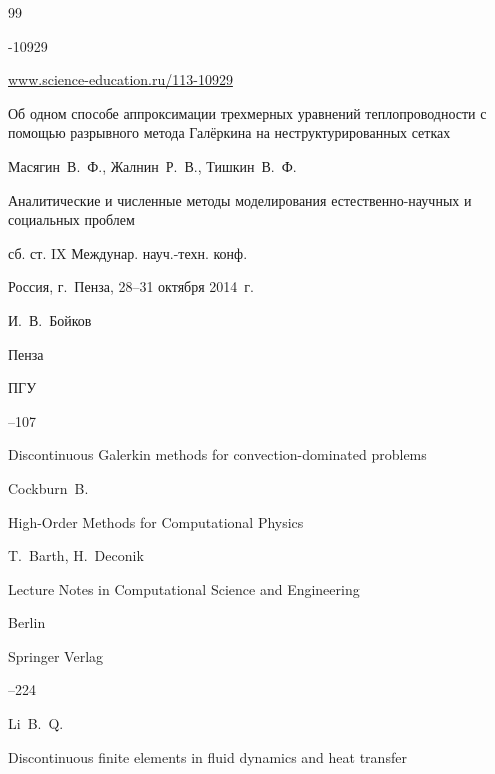 \begin{thebibliography}{99}

-10929

\elink \url{www.science-education.ru/113-10929}






\paper Об одном способе аппроксимации трехмерных уравнений теплопроводности с помощью разрывного метода Галёркина на неструктурированных сетках

\by Масягин~В.~Ф., Жалнин~Р.~В., Тишкин~В.~Ф.

\inbook Аналитические и численные методы моделирования естественно-научных и социальных проблем 

\bookinfo сб. ст. IX Междунар. науч.-техн. конф. 

\procinfo Россия, г.~Пенза, 28--31 октября 2014~г.

\ed И.~В.~Бойков

\publaddr Пенза 

\publ ПГУ


--107











\paper Discontinuous Galerkin methods for convection-dominated problems

\by Cockburn~B.

\inbook High-Order Methods for Computational Physics

\eds T.~Barth, H.~Deconik

\serial Lecture Notes in Computational Science and Engineering


\publaddr Berlin

\publ Springer Verlag 


--224







\by Li~B.~Q.

\book Discontinuous finite elements in fluid dynamics and heat transfer


\end{thebibliography}
